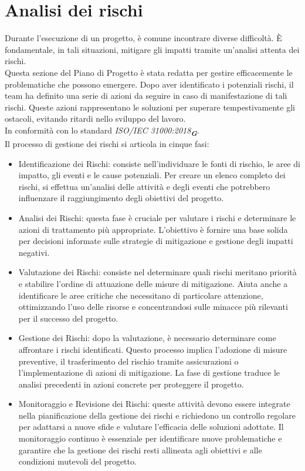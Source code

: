 \section{Analisi dei rischi}
\label{sec:analisi_rischi}
Durante l'esecuzione di un progetto, è comune incontrare diverse difficoltà. È fondamentale, in tali situazioni, mitigare gli impatti tramite un'analisi attenta dei rischi.\\
Questa sezione del Piano di Progetto è stata redatta per gestire efficacemente le problematiche che possono emergere. Dopo aver identificato i potenziali rischi, il team ha definito una serie di azioni da seguire in caso di manifestazione di tali rischi. Queste azioni rappresentano le soluzioni per superare tempestivamente gli ostacoli, evitando ritardi nello sviluppo del lavoro.\\
In conformità con lo standard \emph{ISO/IEC 31000:2018}\textsubscript{\textit{\textbf{G}}}.\\
Il processo di gestione dei rischi si articola in cinque fasi:
\begin{itemize}
    \item Identificazione dei Rischi: consiste nell'individuare le fonti di rischio, le aree di impatto, gli eventi e le cause potenziali. Per creare un elenco completo dei rischi, si effettua un'analisi delle attività e degli eventi che potrebbero influenzare il raggiungimento degli obiettivi del progetto.
    \item Analisi dei Rischi: questa fase è cruciale per valutare i rischi e determinare le azioni di trattamento più appropriate. L'obiettivo è fornire una base solida per decisioni informate sulle strategie di mitigazione e gestione degli impatti negativi.
    \item Valutazione dei Rischi: consiste nel determinare quali rischi meritano priorità e stabilire l'ordine di attuazione delle misure di mitigazione. Aiuta anche a identificare le aree critiche che necessitano di particolare attenzione, ottimizzando l'uso delle risorse e concentrandosi sulle minacce più rilevanti per il successo del progetto.
    \item Gestione dei Rischi: dopo la valutazione, è necessario determinare come affrontare i rischi identificati. Questo processo implica l'adozione di misure preventive, il trasferimento del rischio tramite assicurazioni o l'implementazione di azioni di mitigazione. La fase di gestione traduce le analisi precedenti in azioni concrete per proteggere il progetto.
    \item Monitoraggio e Revisione dei Rischi: queste attività devono essere integrate nella pianificazione della gestione dei rischi e richiedono un controllo regolare per adattarsi a nuove sfide e valutare l'efficacia delle soluzioni adottate. Il monitoraggio continuo è essenziale per identificare nuove problematiche e garantire che la gestione dei rischi resti allineata agli obiettivi e alle condizioni mutevoli del progetto.
\end{itemize}

